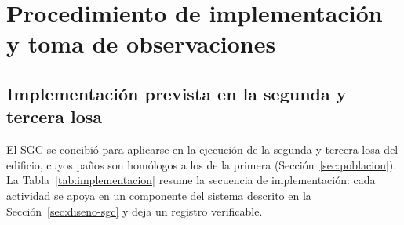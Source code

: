 
\section{Procedimiento de implementación y toma de observaciones}
\label{sec:implementacion}

\subsection{Implementación prevista en la segunda y tercera losa}
\label{sec:implementacion-prevista}

El SGC se concibió para aplicarse en la ejecución de la segunda y tercera losa del edificio, cuyos paños son homólogos a los de la primera (Sección~\ref{sec:poblacion}). La Tabla~\ref{tab:implementacion} resume la secuencia de implementación: cada actividad se apoya en un componente del sistema descrito en la Sección~\ref{sec:diseno-sgc} y deja un registro verificable.

